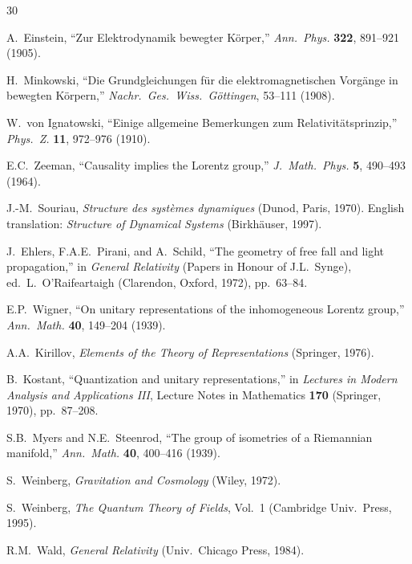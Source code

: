 \documentclass[12pt]{article}
\theoremstyle{plain}
\theoremstyle{definition}
\theoremstyle{remark}
\begin{document}
\begin{thebibliography}{30}

 A.~Einstein, ``Zur Elektrodynamik bewegter K\"orper,'' \emph{Ann.\ Phys.} \textbf{322}, 891--921 (1905).

 H.~Minkowski, ``Die Grundgleichungen f\"ur die elektromagnetischen Vorg\"ange in bewegten K\"orpern,'' \emph{Nachr.\ Ges.\ Wiss.\ G\"ottingen}, 53--111 (1908).

 W.~von Ignatowski, ``Einige allgemeine Bemerkungen zum Relativit\"atsprinzip,'' \emph{Phys.\ Z.} \textbf{11}, 972--976 (1910).

 E.C.~Zeeman, ``Causality implies the Lorentz group,'' \emph{J.\ Math.\ Phys.} \textbf{5}, 490--493 (1964).

 J.-M.~Souriau, \emph{Structure des syst\`emes dynamiques} (Dunod, Paris, 1970). English translation: \emph{Structure of Dynamical Systems} (Birkh\"auser, 1997).

 J.~Ehlers, F.A.E.~Pirani, and A.~Schild, ``The geometry of free fall and light propagation,'' in \emph{General Relativity} (Papers in Honour of J.L.~Synge), ed.\ L.~O'Raifeartaigh (Clarendon, Oxford, 1972), pp.~63--84.

 E.P.~Wigner, ``On unitary representations of the inhomogeneous Lorentz group,'' \emph{Ann.\ Math.} \textbf{40}, 149--204 (1939).

 A.A.~Kirillov, \emph{Elements of the Theory of Representations} (Springer, 1976).

 B.~Kostant, ``Quantization and unitary representations,'' in \emph{Lectures in Modern Analysis and Applications III}, Lecture Notes in Mathematics \textbf{170} (Springer, 1970), pp.~87--208.

 S.B.~Myers and N.E.~Steenrod, ``The group of isometries of a Riemannian manifold,'' \emph{Ann.\ Math.} \textbf{40}, 400--416 (1939).

 S.~Weinberg, \emph{Gravitation and Cosmology} (Wiley, 1972).

 S.~Weinberg, \emph{The Quantum Theory of Fields}, Vol.~1 (Cambridge Univ.\ Press, 1995).

 R.M.~Wald, \emph{General Relativity} (Univ.\ Chicago Press, 1984).


\end{thebibliography}
\end{document}
